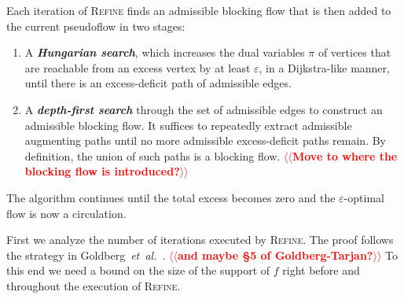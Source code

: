 \documentclass[a4paper,UKenglish]{socg-lipics-v2018}
\makeatletter
\def\note#1{\textcolor{red}{{#1}}}
\def\etal{\emph{et~al.}}
\def\etal{\textit{et~al.}}
\def\eps{\varepsilon}
\def\fsupply{\phi}
\theoremstyle{plain}
\numberwithin{figure}{section}
\def\EMPH#1{\textbf{\emph{\boldmath #1}}}
\def\n@te#1{\textsf{\boldmath \textbf{$\langle\!\langle$#1$\rangle\!\rangle$}}\leavevmode}
\def\note#1{\textcolor{red}{\n@te{#1}}}
\makeatother
\begin{document}

Each iteration of \textsc{Refine} finds an admissible blocking flow that is then added to the current pseudoflow in two stages:
\begin{enumerate}
\item
A \EMPH{Hungarian search}, which increases the dual variables $\pi$ of vertices that are reachable from an excess vertex by at least $\eps$, in a Dijkstra-like manner, until there is an excess-deficit path of admissible edges.
\item
A \EMPH{depth-first search} through the set of admissible edges to construct an admissible blocking flow.
It suffices to repeatedly extract admissible augmenting paths until no more admissible excess-deficit paths remain.
By definition, the union of such paths is a blocking flow. \note{Move to where the blocking flow is introduced?}
\end{enumerate}
The algorithm continues until the total excess becomes zero and the $\eps$-optimal flow is now a circulation.

First we analyze the number of iterations executed by \textsc{Refine}.
The proof follows the strategy in Goldberg~\etal~\cite[Section~3.2]{GHKT17}. \note{and maybe \S5 of Goldberg-Tarjan?}
%
%
To this end we need a bound on the size of the support of $f$ right before and throughout the execution of \textsc{Refine}.
\end{document}
